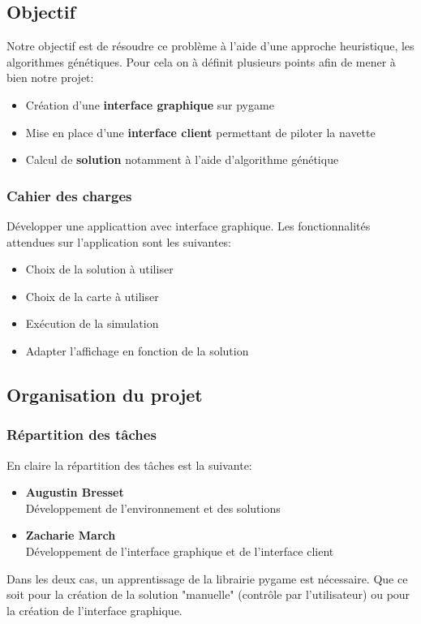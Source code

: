 \documentclass[french,a4paper,10pt,twocolumn]{article}
\begin{document}
\subsection{Objectif}

Notre objectif est de résoudre ce problème à l'aide d'une approche heuristique, les algorithmes génétiques. 
Pour cela on à définit plusieurs points afin de mener à bien notre projet: 
\begin{itemize}
    \item Création d'une \textbf{interface graphique} sur pygame
    \item Mise en place d'une \textbf{interface client} permettant de piloter la navette
    \item Calcul de \textbf{solution} notamment à l'aide d'algorithme génétique    
\end{itemize}

\subsubsection{Cahier des charges}

Développer une applicattion avec interface graphique. Les fonctionnalités attendues sur l'application sont les suivantes:
\begin{itemize}
    \item Choix de la solution à utiliser
    \item Choix de la carte à utiliser
    \item Exécution de la simulation
    \item Adapter l'affichage en fonction de la solution
\end{itemize}

\subsection{Organisation du projet}

\subsubsection{Répartition des tâches}

En claire la répartition des tâches est la suivante:
\begin{itemize}
    \item \textbf{Augustin Bresset}\\
        Développement de l'environnement et des solutions 
    \item \textbf{Zacharie March}\\
        Développement de l'interface graphique et de l'interface client
\end{itemize}
Dans les deux cas, un apprentissage de la librairie pygame est nécessaire. Que ce soit pour la création de la solution "manuelle" (contrôle par l'utilisateur)
ou pour la création de l'interface graphique.
\end{document}
